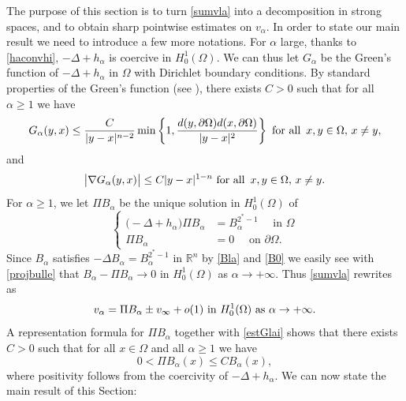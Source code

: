 \documentclass[10pt]{amsart}
\numberwithin{equation}{section}
\newcommand{\R}{\mathbb{R}}
\newcommand{\Om}{\Omega}
\def \bb{\hbox}
\def \va{v_{\alpha}}
\def \ha{h_{\alpha}}
\def \vo {v_{\infty}}
\theoremstyle{plain}
\theoremstyle{remark}
\begin{document}
\medskip

The purpose of this section is to turn \eqref{sumvla} into a decomposition in strong spaces, and to obtain sharp pointwise estimates on $\va$. In order to state our main result we need to introduce a few more notations. For $\alpha$ large, thanks to \eqref{haconvhi}, $-\Delta+\ha$ is coercive in $H^1_0(\Om)$. We can thus let $G_{\alpha}$ be the Green's function of $-\Delta+h_{\alpha}$ in $\Omega$ with Dirichlet boundary conditions. By standard properties of the Green's function (see \cite{RobDirichlet}), there exists $C>0$ such that for all $\alpha \ge 1$ we have 
\begin{equation}\label{estGlai}
	G_{\alpha}(y,x)\leq \frac{C}{|y-x|^{n-2}} \min\left\lbrace 1,\frac{d(y,\partial\Om)d(x,\partial\Om)}{|y-x|^2}\right\rbrace \bb{ for all }\, x,y \in \Om,\,  x\neq y,
\end{equation}
and 
\begin{equation}\label{estnablaGlai}
	\big|\nabla G_{\alpha}(y,x)\big|\leq C |y-x|^{1-n} \bb{ for all } \, x,y \in \Om,\, x\neq y.
\end{equation}
For $\alpha \ge1$,  we let $\Pi B_\alpha$ be the unique solution in $H^1_0(\Om)$ of 
\begin{equation} \label{projbulle}
\left \{ \begin{aligned}
\big(-\Delta + h_\alpha\big) \Pi B_\alpha & = B_{\alpha}^{2^*-1} \quad \text{ in } \Om \\
\Pi B_\alpha & = 0 \quad \text{ on } \partial \Om.
\end{aligned} \right. 
\end{equation}
Since $B_\alpha$ satisfies $-\Delta B_\alpha = B_\alpha^{2^*-1}$ in $\R^n$ by \eqref{Bla} and \eqref{B0} we easily see with \eqref{projbulle} that $B_\alpha - \Pi B_\alpha \to 0$ in $H^1_0(\Om)$ as $\alpha \to + \infty$. Thus \eqref{sumvla} rewrites as 
 \begin{equation} \label{sumvla2}
 	\va=\Pi B_{\alpha}\pm\vo+o(1)  \bb{ in } H_0^1(\Om) \text{ as } \alpha \to + \infty.  
\end{equation}
A representation formula for $\Pi B_\alpha$ together with \eqref{estGlai} shows that there exists $C>0$ such that for all $x \in \Om$ and all $\alpha \ge 1$ we have 
\begin{equation} \label{contprojbulle}
0 < \Pi B_\alpha(x) \le C B_{\alpha}(x),
\end{equation}
where positivity follows from the coercivity of $-\Delta + h_\alpha$. We can now state the main result of this Section: 
\end{document}
